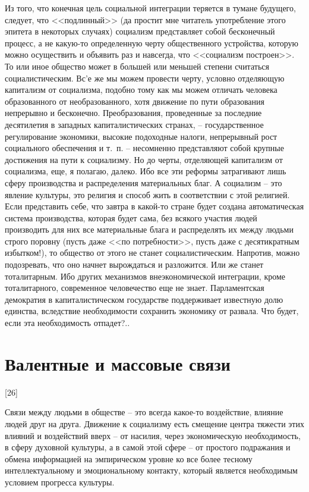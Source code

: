\documentclass{book}
\begin{document}
Из того, что конечная цель социальной интеграции теряется в тумане будущего, следует, что <<подлинный>> (да простит мне читатель употребление этого эпитета в некоторых случаях) социализм представляет собой бесконечный процесс, а не какую-то определенную черту общественного устройства, которую можно осуществить и объявить раз и навсегда, что <<социализм построен>>. То или иное общество может в большей или мень­шей степени считаться социалистическим. Вс'е же мы можем провести черту, условно отделяющую капитализм от социализ­ма, подобно тому как мы можем отличать человека образо­ванного от необразованного, хотя движение по пути образо­вания непрерывно и бесконечно. Преобразования, проведенные за последние десятилетия в западных капиталистических стра­нах, -- государственное регулирование экономики, высокие по­доходные налоги, непрерывный рост социального обеспечения и т.~п. -- несомненно представляют собой крупные достижения на пути к социализму. Но до черты, отделяющей капитализм от социализма, еще, я полагаю, 
далеко. Ибо все эти реформы за­трагивают лишь сферу производства и распределения матери­альных благ. А социализм -- это явление культуры, это религия и способ жить в соответствии с этой религией. Если предста­вить себе, что завтра в какой-то стране будет создана автомати­ческая система производства, которая будет сама, без всякого участия людей  производить для них все материальные блага и распределять их между людьми строго поровну (пусть даже <<по потребности>>, пусть даже с десятикратным избытком!), то общество от этого не станет социалистическим. Напротив, можно подозревать, что оно начнет вырождаться и разложится. Или же станет тоталитарным. Ибо других механизмов внеэконо­мической интеграции, кроме тоталитарного, современное чело­вечество еще не знает. Парламентская демократия в капитали­стическом государстве поддерживает известную долю единства, вследствие необходимости сохранить экономику от развала. Что будет, если эта необходимость отпадет?..



\section{Валентные и массовые связи}
[26]

Связи между людьми в обществе -- это всегда какое-то воздействие, влияние людей друг на друга. Движение к социализму есть смещение центра тяжести этих влияний и воздействий вверх -- от насилия, через экономическую необходимость, в сферу духовной культуры, а в самой этой сфере -- от простого подражания и обмена информацией на эмпирическом уровне ко все более тесному интеллектуальному и эмоциональному контакту, который является необходимым условием прогресса культуры.
\end{document}
